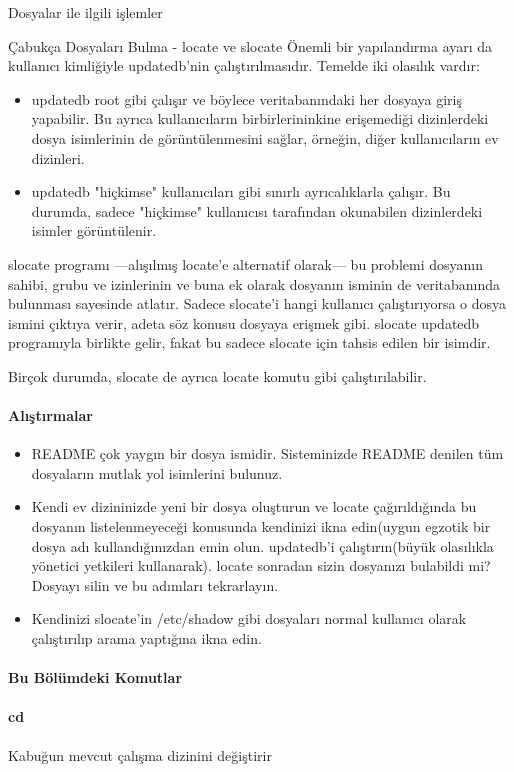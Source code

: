\begin{section}{Dosyalar ile ilgili işlemler}
\begin{subsection}{Çabukça Dosyaları Bulma - locate ve slocate}
	Önemli bir yapılandırma ayarı da kullanıcı kimliğiyle updatedb'nin çalıştırılmasıdır. Temelde iki olasılık vardır:
	\begin{itemize}
	\item updatedb root gibi çalışır ve böylece veritabanındaki her dosyaya giriş yapabilir. Bu ayrıca kullanıcıların birbirlerininkine erişemediği dizinlerdeki dosya isimlerinin de görüntülenmesini sağlar, örneğin, diğer kullanıcıların ev dizinleri.
	\item updatedb "hiçkimse" kullanıcıları gibi sınırlı ayrıcalıklarla çalışır. Bu durumda, sadece "hiçkimse" kullanıcısı tarafından okunabilen dizinlerdeki isimler görüntülenir. 
	\end{itemize}
	
slocate programı —alışılmış locate'e alternatif olarak— bu problemi dosyanın sahibi, grubu ve  izinlerinin ve buna ek olarak dosyanın isminin de veritabanında bulunması sayesinde atlatır. Sadece slocate'i hangi kullanıcı çalıştırıyorsa o dosya ismini çıktıya verir, adeta söz konusu dosyaya erişmek gibi. slocate updatedb programıyla birlikte gelir, fakat bu sadece slocate için tahsis edilen bir isimdir.

Birçok durumda, slocate de ayrıca locate komutu gibi çalıştırılabilir.

\paragraph{Alıştırmalar}{
\begin{itemize}
 \item README çok yaygın bir dosya ismidir. Sisteminizde README denilen tüm dosyaların mutlak yol isimlerini bulunuz.
 \item Kendi ev dizininizde yeni bir dosya oluşturun ve locate çağırıldığında bu dosyanın listelenmeyeceği konusunda kendinizi ikna edin(uygun egzotik bir dosya adı kullandığınızdan emin olun. updatedb'i çalıştırın(büyük olasılıkla yönetici yetkileri kullanarak). locate sonradan sizin dosyanızı bulabildi mi? Dosyayı silin ve bu adımları tekrarlayın.
 \item Kendinizi slocate'in /etc/shadow gibi dosyaları normal kullanıcı olarak çalıştırılıp arama yaptığına ikna edin.
\end{itemize}}

\paragraph{Bu Bölümdeki Komutlar}{}
\paragraph{cd}{Kabuğun mevcut çalışma dizinini değiştirir}

\end{subsection}
\end{section}
